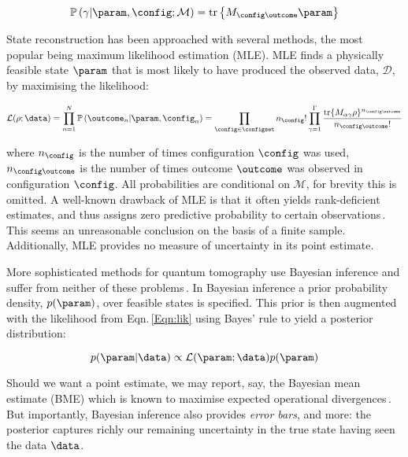 \begin{equation}
\mathbb{P}\left(\gamma\vert\param,\config;\mathcal{M}\right) = \text{tr}\left\{M_{\config\outcome}\param \right\}\label{Eqn:born}\notag
\end{equation}

State reconstruction has been approached with several methods, the most popular being maximum likelihood estimation (MLE). MLE finds a physically feasible state $\param$ that is most likely to have produced the observed data, $\mathcal{D}$, by maximising the likelihood:

\begin{equation}
\label{Eqn:lik}
\mathcal{L}(\rho;\data)=\prod_{n=1}^{N} \mathbb{P}\left(\outcome_n\vert\param,\config_n\right) = \prod_{\config \in \configset}n_{\config}!\prod_{\gamma=1}^{\Gamma}\frac{\mbox{tr}\{M_{\alpha\gamma}\rho\}^{n_{\config\outcome}}}{n_{\config\outcome}!}
\end{equation}

where $n_{\config}$ is the number of times configuration $\config$ was used, $n_{\config\outcome}$ is the number of times outcome $\outcome$ was observed in configuration $\config$. All probabilities are conditional on $\mathcal{M}$, for brevity this is omitted. A well-known drawback of MLE is that it often yields rank-deficient estimates, and thus assigns zero predictive probability to certain observations\,\citep{BayesianTomography}. This seems an unreasonable conclusion on the basis of a finite sample.
Additionally, MLE provides no measure of uncertainty in its point estimate.

More sophisticated methods for quantum tomography use Bayesian inference and suffer from neither of these problems\,\cite[][and refs.]{BayesianTomography}. In Bayesian inference a prior probability density, $p(\param)$, over feasible states is specified. This prior is then augmented with the likelihood from Eqn.\,\eqref{Eqn:lik} using Bayes' rule to yield a posterior distribution:

\begin{equation}
\label{Eqn:bayes}
p(\param\vert\data)\propto \mathcal{L}(\param;\data)p(\param)
\end{equation}

Should we want a point estimate, we may report, say, the Bayesian mean estimate (BME) which is known to maximise expected operational divergences\,\citep{BayesianTomography,BayesianOptimality}. But importantly, Bayesian inference also provides \emph{error bars}, and more: the posterior captures richly our remaining uncertainty in the true state having seen the data $\data$. 

